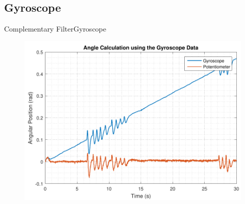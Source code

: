 \subsection{Gyroscope}
\begin{frame}{Complementary Filter}{Gyroscope}
\begin{figure}
	\centering
	\includegraphics[scale=0.6]{Pictures/angleGyro.pdf}
\end{figure}
%
\end{frame}
